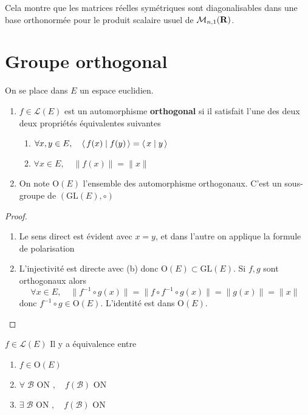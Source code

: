 \begin{rem}
    Cela montre que les matrices réelles symétriques sont diagonalisables dans une base orthonormée pour le produit scalaire usuel de $ \mathcal  M_{n,1}(\mathbf R)$.
\end{rem}

\section{Groupe orthogonal}

On se place dans $E$ un espace euclidien.

 \begin{thmdef}
\begin{enumerate}
    \item $f \in  \mathcal  L(E)$ est un automorphisme \textbf{orthogonal} si il satisfait l'une des deux deux propriétés équivalentes suivantes \begin{enumerate}
        \item $ \forall  x, y \in  E, \quad  \scalar{f(x)}{f(y)}= \scalar{x}{y}$
        \item $\forall  x \in  E, \quad  \|f(x)\|=\|x\|$
    \end{enumerate}
\item On note $\mathrm  O(E)$ l'ensemble des automorphisme orthogonaux. C'est un sous-groupe de $(\mathrm {GL}(E), \circ)$
\end{enumerate}
\end{thmdef}

\begin{proof}
\begin{enumerate}
    \item Le sens direct est évident avec $x=y$, et dans l'autre on applique la formule de polarisation
    \item L'injectivité est directe avec (b) donc  $\mathrm O(E)\subset \mathrm {GL}(E)$. Si $f, g$ sont orthogonaux alors  \[
            \forall  x \in  E, \quad  \|f^{-1}\circ g(x)\|=\|f\circ f^{-1}\circ g(x)\|=\|g(x)\|=\|x\|
    \] 
    donc $f^{-1}\circ g \in \mathrm O(E)$. L'identité est dans $\mathrm  O(E)$.
\end{enumerate}
\end{proof}

\begin{thm}
    \Hyp $f \in  \mathcal  L(E)$
    \Conc Il y a équivalence entre \begin{enumerate}
        \item $f \in  \mathrm   O(E)$
        \item  $ \forall  \;\mathcal  B \text{ ON }, \quad  f(\mathcal B) \text{ ON }$
        \item  $ \exists  \;\mathcal  B \text{ ON }, \quad  f(\mathcal B) \text{ ON }$
    \end{enumerate}
\end{thm}

